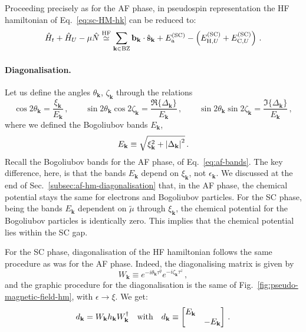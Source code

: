 Proceeding precisely as for the AF phase, in pseudospin representation the HF hamiltonian of Eq.~\eqref{eq:sc-HM-hk} can be reduced to:
\begin{equation}\label{eq:sc-hm-spin-h}
	\hat H_t + \hat H_U - \mu \hat N \stackrel{\mathrm{HF}}{\simeq} \sum_{\mathbf{k} \in \mathrm{BZ}} \mathbf{b}_\mathbf{k} \cdot \hat{\mathbf{s}}_\mathbf{k} + E_\mathrm{a}^{(\mathrm{SC})} - \left(
	E_{\mathrm{H},U}^{(\mathrm{SC})} + E_{\mathrm{C},U}^{(\mathrm{SC})}
	\right) \, .
\end{equation}

\paragraph{Diagonalisation.} 

Let us define the angles $\theta_\mathbf{k}$, $\zeta_\mathbf{k}$ through the relations
\[
\cos 2\theta_\mathbf{k} = \frac{\xi_\mathbf{k}}{E_\mathbf{k}} \, ,
\qquad
\sin 2\theta_\mathbf{k} \cos 2\zeta_\mathbf{k} = \frac{\Re\lbrace \Delta_\mathbf{k} \rbrace}{E_\mathbf{k}} \, ,
\qquad
\sin 2\theta_\mathbf{k} \sin 2\zeta_\mathbf{k} = \frac{\Im\lbrace \Delta_\mathbf{k} \rbrace}{E_\mathbf{k}} \, ,
\]
where we defined the Bogoliubov bands $E_\mathbf{k}$,
\begin{equation}\label{appeq:sc-bands}
	E_\mathbf{k} \equiv \sqrt{\xi_\mathbf{k}^2 + \abs{\Delta_\mathbf{k}}^2} \, .
\end{equation}
Recall the Bogoliubov bands for the AF phase, of Eq.~\eqref{eq:af-bands}. The key difference, here, is that the bands $E_\mathbf{k}$ depend on $\xi_\mathbf{k}$, not $\epsilon_\mathbf{k}$. We discussed at the end of Sec.~\ref{subsec:af-hm-diagonalisation} that, in the AF phase, the chemical potential stays the same for electrons and Bogoliubov particles. For the SC phase, being the bands $E_\mathbf{k}$ dependent on $\tilde{\mu}$ through $\xi_\mathbf{k}$, the chemical potential for the Bogoliubov particles is identically zero. This implies that the chemical potential lies within the SC gap.

For the SC phase, diagonalisation of the HF hamiltonian follows the same procedure as was for the AF phase. Indeed, the diagonalising matrix is given by
\begin{equation}\label{eq:sc-hm-diagonalizer}
	W_\mathbf{k} \equiv e^{-i \theta_\mathbf{k} \tau^y} e^{-i \zeta_\mathbf{k} \tau^z} \, ,
\end{equation}
and the graphic procedure for the diagonalisation is the same of Fig.~\ref{fig:pseudo-magnetic-field-hm}, with $\epsilon \to \xi$. We get:
\begin{equation}\label{eq:sc-WhW+-hm}
	d_\mathbf{k} = W_\mathbf{k} h_\mathbf{k} W_\mathbf{k}^\dagger
	\qq{with}
	d_\mathbf{k} \equiv \begin{bmatrix}
		E_\mathbf{k} & \\
		& - E_\mathbf{k}
	\end{bmatrix} \, .
\end{equation}


